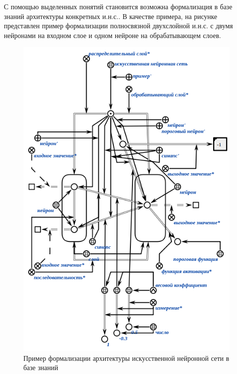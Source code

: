 \begin{SCn}
\end{SCn}

\begin{SCn}
\end{SCn}

С помощью выделенных понятий становится возможна формализация в базе знаний архитектуры конкретных и.н.с.. В качестве примера, на рисунке  представлен пример формализации полносвязной двухслойной и.н.с. с двумя нейронами на входном слое и одном нейроне на обрабатывающем слоев.

\begin{figure}
	\centering
	\includegraphics[width=0.8\linewidth]{author/part3/figures/neural_network_scg.png}
	\caption{Пример формализации архитектуры искусственной нейронной сети в базе знаний}
	\label{fig:neural_network_scg}
\end{figure}

